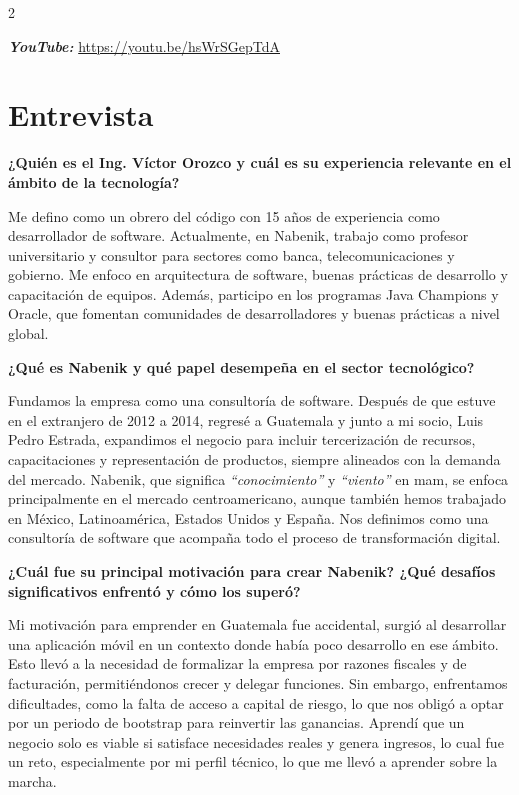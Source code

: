 \documentclass[12pt,spanish,Letterpaper,openany]{book}
\begin{document}
\begin {multicols}{2}

\textbf{\emph{YouTube:}} \url{https://youtu.be/hsWrSGepTdA}

\hypertarget{entrevista-2}{%
\section{Entrevista}\label{entrevista-2}}

\textbf{¿Quién es el Ing. Víctor Orozco y cuál es su experiencia relevante en el ámbito de la tecnología?}

Me defino como un obrero del código con 15 años de experiencia como desarrollador de software. Actualmente, en Nabenik, trabajo como profesor universitario y consultor para sectores como banca, telecomunicaciones y gobierno. Me enfoco en arquitectura de software, buenas prácticas de desarrollo y capacitación de equipos. Además, participo en los programas Java Champions y Oracle, que fomentan comunidades de desarrolladores y buenas prácticas a nivel global.

\textbf{¿Qué es Nabenik y qué papel desempeña en el sector tecnológico?}

Fundamos la empresa como una consultoría de software. Después de que estuve en el extranjero de 2012 a 2014, regresé a Guatemala y junto a mi socio, Luis Pedro Estrada, expandimos el negocio para incluir tercerización de recursos, capacitaciones y representación de productos, siempre alineados con la demanda del mercado. Nabenik, que significa \emph{``conocimiento''} y \emph{``viento''} en mam, se enfoca principalmente en el mercado centroamericano, aunque también hemos trabajado en México, Latinoamérica, Estados Unidos y España. Nos definimos como una consultoría de software que acompaña todo el proceso de transformación digital.

\textbf{¿Cuál fue su principal motivación para crear Nabenik? ¿Qué desafíos significativos enfrentó y cómo los superó?}

Mi motivación para emprender en Guatemala fue accidental, surgió al desarrollar una aplicación móvil en un contexto donde había poco desarrollo en ese ámbito. Esto llevó a la necesidad de formalizar la empresa por razones fiscales y de facturación, permitiéndonos crecer y delegar funciones. Sin embargo, enfrentamos dificultades, como la falta de acceso a capital de riesgo, lo que nos obligó a optar por un periodo de bootstrap para reinvertir las ganancias. Aprendí que un negocio solo es viable si satisface necesidades reales y genera ingresos, lo cual fue un reto, especialmente por mi perfil técnico, lo que me llevó a aprender sobre la marcha.


\end{multicols}
\end{document}
